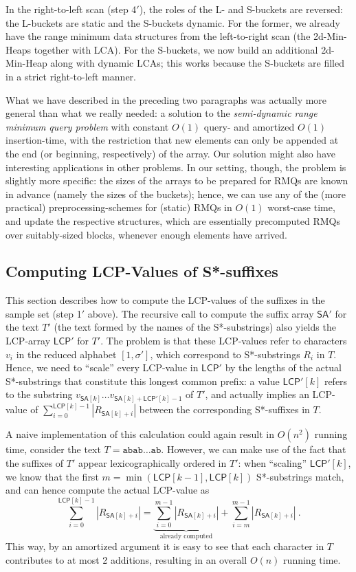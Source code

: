 \documentclass[11pt,onecolumn,final]{article} \usepackage[latin1]{inputenc}
\newcommand{\LCP}[0]{\mathsf{LCP}}
\newcommand{\SA}[0]{\mathsf{SA}}
\theoremstyle{plain}
\theoremstyle{remark}
\begin{document}
In the right-to-left scan (step 4$'$), the roles of the L- and S-buckets are reversed: the L-buckets are static and the S-buckets dynamic. For the former, we already have the range minimum data structures from the left-to-right scan (the 2d-Min-Heaps together with LCA). For the S-buckets, we now build an additional 2d-Min-Heap along with dynamic LCAs; this works because the S-buckets are filled in a strict right-to-left manner.

What we have described in the preceding two paragraphs was actually more general than what we really needed: a solution to the \emph{semi-dynamic range minimum query problem} with constant $O(1)$ query- and amortized $O(1)$ insertion-time, with the restriction that new elements can only be appended at the end (or beginning, respectively) of the array. Our solution might also have interesting applications in other problems. In our setting, though, the problem is slightly more specific: the sizes of the arrays to be prepared for RMQs are known in advance (namely the sizes of the buckets); hence, we can use any of the (more practical) preprocessing-schemes for (static) RMQs in $O(1)$ worst-case time\cite{fischer07new,alstrup04nearest}, and update the respective structures, which are essentially precomputed RMQs over suitably-sized blocks, whenever enough elements have arrived.

\subsection{Computing LCP-Values of S*-suffixes}
\label{sect:recursive_lcp}
This section describes how to compute the LCP-values of the suffixes in the sample set (step 1$'$ above). The recursive call to compute the suffix array $\SA'$ for the text $T'$ (the text formed by the names of the S*-substrings) also yields the LCP-array $\LCP'$ for $T'$. The problem is that these LCP-values refer to characters $v_i$ in the reduced alphabet $[1,\sigma']$, which correspond to S*-substrings $R_i$ in $T$. Hence, we need to ``scale'' every LCP-value in $\LCP'$ by the lengths of the actual S*-substrings that constitute this longest common prefix: a value $\LCP'[k]$ refers to the substring $v_{\SA[k]}\dots v_{\SA[k]+\LCP'[k]-1}$ of $T'$, and actually implies an LCP-value of $\sum_{i=0}^{\LCP[k]-1}|R_{\SA[k]+i}|$ between the corresponding S*-suffixes in $T$.

A naive implementation of this calculation could again result in $O(n^2)$ running time, consider the text $T=\mathtt{abab}\dots \mathtt{ab}$. However, we can make use of the fact that the suffixes of $T'$ appear lexicographically ordered in $T'$: when ``scaling'' $\LCP'[k]$, we know that the first $m = \min(\LCP[k-1],\LCP[k])$ S*-substrings match, and can hence compute the actual LCP-value as
$$
\sum_{i=0}^{\LCP[k]-1}|R_{\SA[k]+i}| = \underbrace{\sum_{i=0}^{m-1}|R_{\SA[k]+i}|}_{\text{already computed}} + \sum_{i=m}^{m-1}|R_{\SA[k]+i}|\ .
$$
This way, by an amortized argument it is easy to see that each character in $T$ contributes to at most 2 additions, resulting in an overall $O(n)$ running time.
\end{document}
